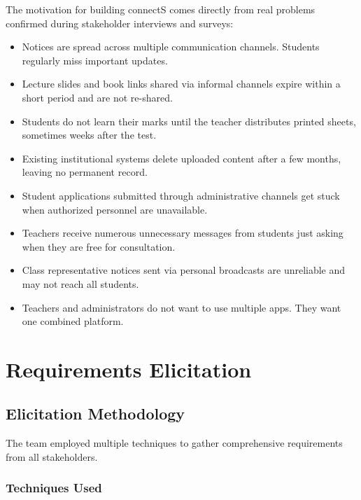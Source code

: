\documentclass[12pt,a4paper]{article}
\begin{document}
The motivation for building connectS comes directly from real problems confirmed during stakeholder interviews and surveys:

\begin{itemize}[leftmargin=*, label=\textbullet, itemsep=4pt]
  \item Notices are spread across multiple communication channels. Students regularly miss important updates.
  \item Lecture slides and book links shared via informal channels expire within a short period and are not re-shared.
  \item Students do not learn their marks until the teacher distributes printed sheets, sometimes weeks after the test.
  \item Existing institutional systems delete uploaded content after a few months, leaving no permanent record.
  \item Student applications submitted through administrative channels get stuck when authorized personnel are unavailable.
  \item Teachers receive numerous unnecessary messages from students just asking when they are free for consultation.
  \item Class representative notices sent via personal broadcasts are unreliable and may not reach all students.
  \item Teachers and administrators do not want to use multiple apps. They want one combined platform.
\end{itemize}
\newpage

\newpage
\section{Requirements Elicitation}

\subsection{Elicitation Methodology}

The team employed multiple techniques to gather comprehensive requirements from all stakeholders.

\subsubsection{Techniques Used}
\end{document}
